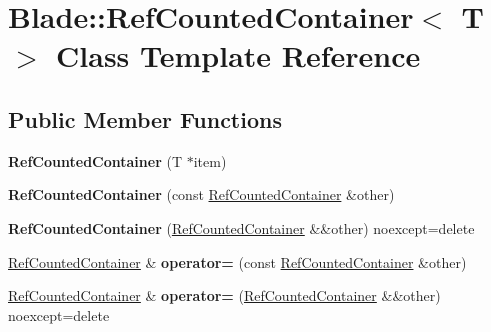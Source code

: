 \hypertarget{class_blade_1_1_ref_counted_container}{}\section{Blade\+:\+:Ref\+Counted\+Container$<$ T $>$ Class Template Reference}
\label{class_blade_1_1_ref_counted_container}
\subsection*{Public Member Functions}
\begin{DoxyCompactItemize}
\item 
\mbox{\label{class_blade_1_1_ref_counted_container_a0fb18560e2c5e73fc8f26d0df78cb696}} 
{\bfseries Ref\+Counted\+Container} (T $\ast$item)
\item 
\mbox{\label{class_blade_1_1_ref_counted_container_a3ad6ba693cc2c0fa7a50b4acd7fba8a1}} 
{\bfseries Ref\+Counted\+Container} (const \hyperlink{class_blade_1_1_ref_counted_container}{Ref\+Counted\+Container} \&other)
\item 
\mbox{\label{class_blade_1_1_ref_counted_container_ac9d85744784db9cfbe196cbd6abfd8d2}} 
{\bfseries Ref\+Counted\+Container} (\hyperlink{class_blade_1_1_ref_counted_container}{Ref\+Counted\+Container} \&\&other) noexcept=delete
\item 
\mbox{\label{class_blade_1_1_ref_counted_container_acf5a91f226347ee889ba699c254c71c3}} 
\hyperlink{class_blade_1_1_ref_counted_container}{Ref\+Counted\+Container} \& {\bfseries operator=} (const \hyperlink{class_blade_1_1_ref_counted_container}{Ref\+Counted\+Container} \&other)
\item 
\mbox{\label{class_blade_1_1_ref_counted_container_ae3e44758f8646176904f38c71266791f}} 
\hyperlink{class_blade_1_1_ref_counted_container}{Ref\+Counted\+Container} \& {\bfseries operator=} (\hyperlink{class_blade_1_1_ref_counted_container}{Ref\+Counted\+Container} \&\&other) noexcept=delete
\item 
\mbox{\label{class_blade_1_1_ref_counted_container_a903d52fa217c9e6e30d931f5a9703c61}} 

\end{DoxyCompactItemize}
